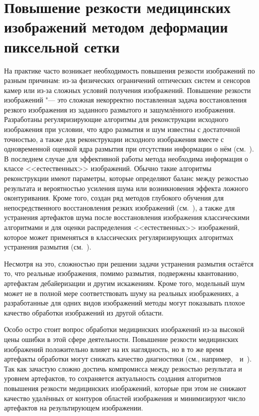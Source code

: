 \chapter{Повышение резкости медицинских изображений методом деформации пиксельной сетки}\label{ch:ch2}

На практике часто возникает необходимость повышения резкости изображений по разным причинам: из-за физических ограничений оптических систем и сенсоров камер или из-за сложных условий получения изображений. 
Повышение резкости изображений "--- это сложная некорректно поставленная задача восстановления резкого изображения из заданного размытого и зашумлённого изображения. Разработаны регуляризирующие алгоритмы для реконструкции исходного изображения при условии, что ядро размытия и шум известны с достаточной точностью, а также для реконструкции исходного изображения вместе с одновременной оценкой ядра размытия при отсутствии информации о нём (см.~\cite{wang2014recent}). В последнем случае для эффективной работы метода необходима информация о классе <<естественных>> изображений. Обычно такие алгоритмы реконструкции имеют параметры, которые определяют баланс между резкостью результата и вероятностью усиления шума или возникновения эффекта ложного оконтуривания. Кроме того, создан ряд методов глубокого обучения для непосредственного восстановления резких изображений (см.~\cite{SU202246}), а также для устранения артефактов шума после восстановления изображения классическими алгоритмами и для оценки распределения <<естественных>> изображений, которое может применяться в классических регуляризирующих алгоритмах устранения размытия (см.~\cite{Zhang2022}).

Несмотря на это, сложностью при решении задачи устранения размытия остаётся то, что реальные изображения, помимо размытия, подвержены квантованию, артефактам дебайеризации и другим искажениям. Кроме того, модельный шум может не в полной мере соответствовать шуму на реальных изображениях, а разработанные для одних видов изображений методы могут показывать плохое качество обработки изображений из другой области.

Особо остро стоит вопрос обработки медицинских изображений из-за высокой цены ошибки в этой сфере деятельности. Повышение резкости медицинских изображений положительно влияет на их наглядность, но в то же время артефакты обработки могут снижать качество диагностики (см., например,~\cite{Nakajima2023}~и~\cite{CLARK2018927}). Так как зачастую сложно достичь компромисса между резкостью результата и уровнем артефактов, то сохраняется актуальность создания алгоритмов повышения резкости медицинских изображений, которые при этом не снижают качество удалённых от контуров областей изображения и минимизируют число артефактов на результирующем изображении.

